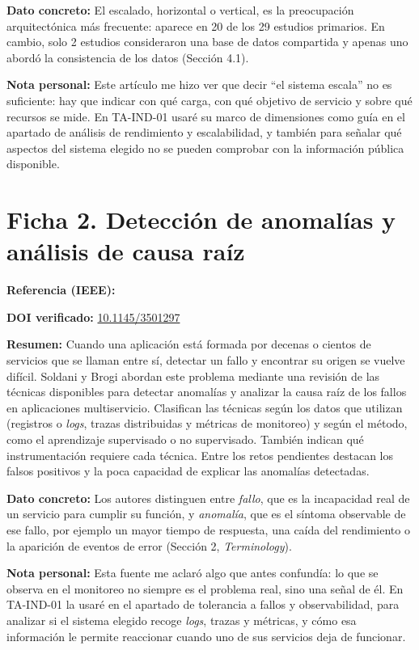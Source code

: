 \documentclass[11pt,a4paper]{article}
\newcommand{\campo}[1]{\par\textbf{#1}\enspace}
\begin{document}
\campo{Dato concreto:} El escalado, horizontal o vertical, es la preocupación arquitectónica más frecuente: aparece en 20 de los 29 estudios primarios. En cambio, solo 2 estudios consideraron una base de datos compartida y apenas uno abordó la consistencia de los datos (Sección 4.1).

\campo{Nota personal:} Este artículo me hizo ver que decir \enquote{el sistema escala} no es suficiente: hay que indicar con qué carga, con qué objetivo de servicio y sobre qué recursos se mide. En TA-IND-01 usaré su marco de dimensiones como guía en el apartado de análisis de rendimiento y escalabilidad, y también para señalar qué aspectos del sistema elegido no se pueden comprobar con la información pública disponible.

\section*{Ficha 2. Detección de anomalías y análisis de causa raíz}

\campo{Referencia (IEEE):} 

\campo{DOI verificado:} \href{https://doi.org/10.1145/3501297}{10.1145/3501297}

\campo{Resumen:} Cuando una aplicación está formada por decenas o cientos de servicios que se llaman entre sí, detectar un fallo y encontrar su origen se vuelve difícil. Soldani y Brogi abordan este problema mediante una revisión de las técnicas disponibles para detectar anomalías y analizar la causa raíz de los fallos en aplicaciones multiservicio. Clasifican las técnicas según los datos que utilizan (registros o \emph{logs}, trazas distribuidas y métricas de monitoreo) y según el método, como el aprendizaje supervisado o no supervisado. También indican qué instrumentación requiere cada técnica. Entre los retos pendientes destacan los falsos positivos y la poca capacidad de explicar las anomalías detectadas.

\campo{Dato concreto:} Los autores distinguen entre \emph{fallo}, que es la incapacidad real de un servicio para cumplir su función, y \emph{anomalía}, que es el síntoma observable de ese fallo, por ejemplo un mayor tiempo de respuesta, una caída del rendimiento o la aparición de eventos de error (Sección 2, \emph{Terminology}).

\campo{Nota personal:} Esta fuente me aclaró algo que antes confundía: lo que se observa en el monitoreo no siempre es el problema real, sino una señal de él. En TA-IND-01 la usaré en el apartado de tolerancia a fallos y observabilidad, para analizar si el sistema elegido recoge \emph{logs}, trazas y métricas, y cómo esa información le permite reaccionar cuando uno de sus servicios deja de funcionar.
\end{document}
